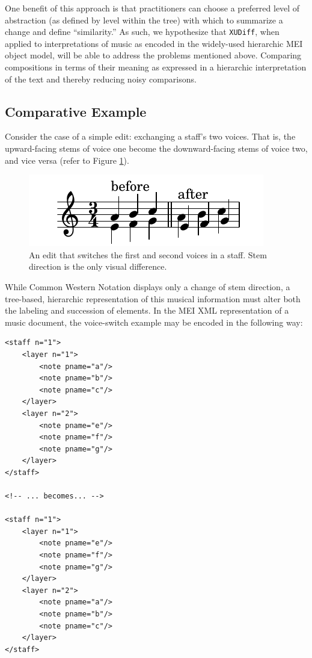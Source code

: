 \documentclass{article}
\begin{document}
One benefit of this approach is that practitioners can choose a preferred level of abstraction
(as defined by level within the tree) with which to summarize a change and define ``similarity.''
As such, we hypothesize that \texttt{XUDiff},
when applied to interpretations of music as encoded in the widely-used hierarchic MEI object model,
will be able to address the problems mentioned above.
Comparing compositions in terms of their meaning as expressed in a hierarchic interpretation of the text and thereby reducing noisy comparisons.


\subsection{Comparative Example}
Consider the case of a simple edit: exchanging a staff's two voices.
That is, the upward-facing stems of voice one become the downward-facing stems of voice two, and vice versa (refer to Figure \ref{fig:voice_swap}).

\begin{figure}[!htb]
\centering
\includegraphics[width=0.8\columnwidth]{layers.pdf}
\caption{An edit that switches the first and second voices in a staff. Stem direction is the only visual difference.}
\label{fig:voice_swap}
\end{figure}

While Common Western Notation displays only a change of stem direction,
a tree-based, hierarchic representation of this musical information must alter both the labeling and succession of elements.
In the MEI XML representation of a music document,
the voice-switch example may be encoded in the following way:

\begin{verbatim}
<staff n="1"> 
    <layer n="1">
        <note pname="a"/>
        <note pname="b"/>
        <note pname="c"/>
    </layer>
    <layer n="2">
        <note pname="e"/>
        <note pname="f"/>
        <note pname="g"/>
    </layer>
</staff>

<!-- ... becomes... -->

<staff n="1">
    <layer n="1">
        <note pname="e"/>
        <note pname="f"/>
        <note pname="g"/>
    </layer>
    <layer n="2">
        <note pname="a"/>
        <note pname="b"/>
        <note pname="c"/>
    </layer>
</staff>
\end{verbatim}
\end{document}
